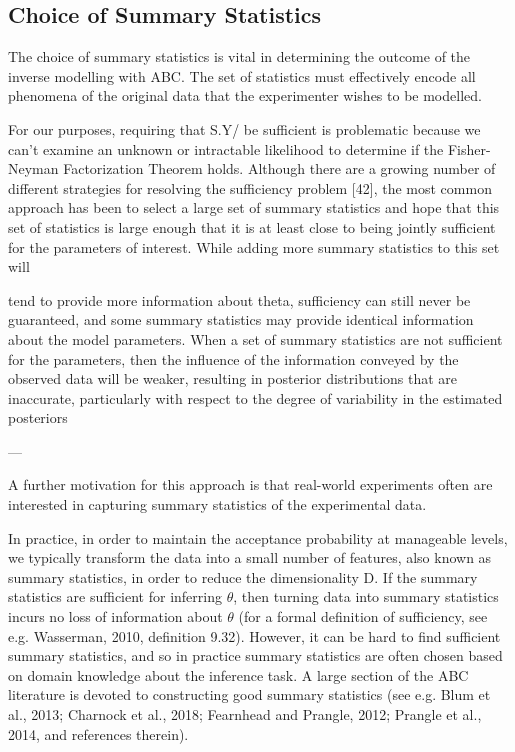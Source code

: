 \subsection{Choice of Summary Statistics}

The choice of summary statistics is vital in determining the outcome of the inverse modelling with ABC. The set of statistics must effectively encode all phenomena of the original data that the experimenter wishes to be modelled. 

For our purposes, requiring that S.Y/ be sufficient is problematic because we
can’t examine an unknown or intractable likelihood to determine if the Fisher- Neyman Factorization Theorem holds. Although there are a growing number of different strategies for resolving the sufficiency problem [42], the most common approach has been to select a large set of summary statistics and hope that this set of statistics is large enough that it is at least close to being jointly sufficient for the parameters of interest. While adding more summary statistics to this set will

tend to provide more information about theta, sufficiency can still never be guaranteed, and some summary statistics may provide identical information about the model parameters. When a set of summary statistics are not sufficient for the parameters, then the influence of the information conveyed by the observed data will be weaker, resulting in posterior distributions that are inaccurate, particularly with respect to the degree of variability in the estimated posteriors


---

A further motivation for this approach is that real-world experiments often are interested in capturing summary statistics of the experimental data. 

In practice, in order to maintain the acceptance probability at manageable levels, we typically transform the data into a small number of features, also known as summary statistics, in order to reduce the dimensionality D. If the summary statistics are sufficient for inferring $\theta$, then turning data into summary statistics incurs no loss of information about $\theta$ (for a formal definition of sufficiency, see e.g. Wasserman, 2010, definition 9.32). However, it can be hard to find sufficient summary statistics, and so in practice summary statistics are often chosen based on domain knowledge about the inference task. A large section of the ABC literature is devoted to constructing good summary statistics (see e.g. Blum et al., 2013; Charnock et al., 2018; Fearnhead and Prangle, 2012; Prangle et al., 2014, and references therein).


